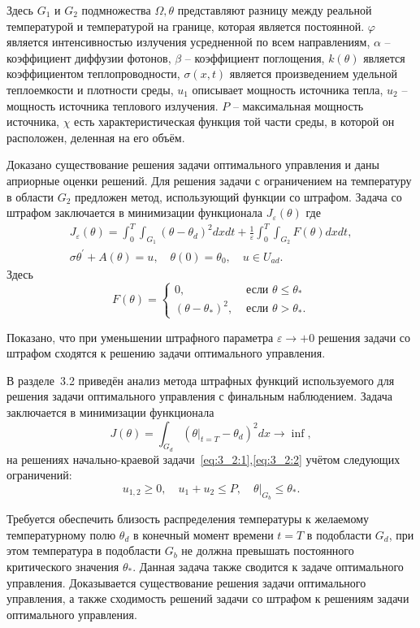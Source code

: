 Здесь $G_{1}$ и $G_{2}$ подмножества $\Omega, \theta$
представляют разницу между реальной температурой
и температурой на границе, которая является постоянной.
$\varphi$ является интенсивностью излучения усредненной по всем направлениям,
$\alpha$ -- коэффициент диффузии фотонов, $\beta$ -- коэффициент поглощения,
$k(\theta)$ является коэффициентом теплопроводности, $\sigma(x, t)$
является произведением удельной теплоемкости и плотности среды, $u_{1}$
описывает мощность источника тепла, $u_{2}$ -- мощность источника теплового излучения.
$P$ -- максимальная мощность источника,
$\chi$ есть характеристическая функция той части среды,
в которой он расположен, деленная на его объём.


Доказано существование решения задачи оптимального
управления и даны априорные оценки решений.
Для решения задачи с ограничением на температуру в области $G_2$
предложен метод, использующий функции со штрафом.
Задача со штрафом заключается в минимизации функционала $J_{\varepsilon}(\theta)$
где
\begin{gather*}
    J_{\varepsilon}(\theta)=\int_{0}^{T}
    \int_{G_{1}}\left(\theta-\theta_{d}\right)^{2} dx dt
    +\frac{1}{\varepsilon} \int_{0}^{T}
    \int_{G_{2}} F(\theta) d x d t, \\
    \sigma \theta^{\prime}+A(\theta)=u,
    \quad \theta(0)=\theta_{0}, \quad u \in U_{a d}.
\end{gather*}
Здесь
\[
    F(\theta)=
    \begin{cases}
        0, & \text { если } \theta \leq \theta_{*} \\
        \left(\theta-\theta_{*}\right)^{2},
        & \text { если } \theta>\theta_{*}.
    \end{cases}
\]


Показано, что при уменьшении штрафного параметра $\varepsilon \rightarrow +0$
решения задачи со штрафом сходятся к решению задачи оптимального управления.

В разделе~3.2 приведён анализ метода штрафных функций используемого
для решения задачи оптимального управления с финальным наблюдением.
Задача заключается в минимизации функционала
\[
    J(\theta)=\int_{G_{d}}\left(\left.\theta\right|_{t=T}
    -\theta_{d}\right)^{2} d x \rightarrow \inf,
\]
на решениях начально-краевой задачи~\eqref{eq:3_2:1},\eqref{eq:3_2:2}
учётом следующих ограничений:
\[
    u_{1,2} \geq 0, \quad u_{1}+u_{2} \leq P,\left.\quad \theta\right|_{G_{b}} \leq \theta_{*}.
\]

Требуется обеспечить близость распределения температуры к желаемому температурному полю $\theta_{d}$
в конечный момент времени $t=T$ в подобласти $G_{d}$, при этом температура в подобласти $G_{b}$
не должна превышать постоянного критического значения $\theta_{*}$.
Данная задача также сводится к задаче оптимального управления.
Доказывается существование решения задачи оптимального управления, а также
сходимость решений задачи со штрафом к решениям задачи оптимального управления.


